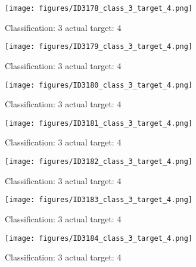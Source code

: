 \begin{figure}[h!]
\begin{center}
\texttt{[image: figures/ID3178\_class\_3\_target\_4.png]}
\end{center}
\caption{ Classification: 3 actual target: 4}
\label{fig:ID3178_class_3_target_4}
\end{figure}
\begin{figure}[h!]
\begin{center}
\texttt{[image: figures/ID3179\_class\_3\_target\_4.png]}
\end{center}
\caption{ Classification: 3 actual target: 4}
\label{fig:ID3179_class_3_target_4}
\end{figure}
\begin{figure}[h!]
\begin{center}
\texttt{[image: figures/ID3180\_class\_3\_target\_4.png]}
\end{center}
\caption{ Classification: 3 actual target: 4}
\label{fig:ID3180_class_3_target_4}
\end{figure}
\begin{figure}[h!]
\begin{center}
\texttt{[image: figures/ID3181\_class\_3\_target\_4.png]}
\end{center}
\caption{ Classification: 3 actual target: 4}
\label{fig:ID3181_class_3_target_4}
\end{figure}
\begin{figure}[h!]
\begin{center}
\texttt{[image: figures/ID3182\_class\_3\_target\_4.png]}
\end{center}
\caption{ Classification: 3 actual target: 4}
\label{fig:ID3182_class_3_target_4}
\end{figure}
\begin{figure}[h!]
\begin{center}
\texttt{[image: figures/ID3183\_class\_3\_target\_4.png]}
\end{center}
\caption{ Classification: 3 actual target: 4}
\label{fig:ID3183_class_3_target_4}
\end{figure}
\begin{figure}[h!]
\begin{center}
\texttt{[image: figures/ID3184\_class\_3\_target\_4.png]}
\end{center}
\caption{ Classification: 3 actual target: 4}
\label{fig:ID3184_class_3_target_4}
\end{figure}
